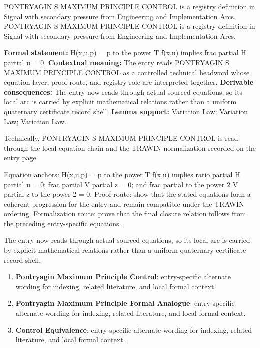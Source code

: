 
\begingroup\small
{}
PONTRYAGIN S MAXIMUM PRINCIPLE CONTROL is a registry definition in Signal with secondary pressure from Engineering and Implementation Arcs. PONTRYAGIN S MAXIMUM PRINCIPLE CONTROL is a registry definition in Signal with secondary pressure from Engineering and Implementation Arcs.

\begingroup\footnotesize\setlength{\emergencystretch}{3em}\sloppy
\textbf{Formal statement:} H(x,u,p) = p to the power T f(x,u) implies frac partial H partial u = 0. \textbf{Contextual meaning:} The entry reads PONTRYAGIN S MAXIMUM PRINCIPLE CONTROL as a controlled technical headword whose equation layer, proof route, and registry role are interpreted together. \textbf{Derivable consequences:} The entry now reads through actual sourced equations, so its local arc is carried by explicit mathematical relations rather than a uniform quaternary certificate record shell. \textbf{Lemma support:} Variation Law; Variation Law; Variation Law.\par
\endgroup

Technically, PONTRYAGIN S MAXIMUM PRINCIPLE CONTROL is read through the local equation chain and the TRAWIN normalization recorded on the entry page.

Equation anchors: H(x,u,p) = p to the power T f(x,u) implies ratio partial H partial u = 0; frac partial V partial z = 0; and frac partial to the power 2 V partial z to the power 2 = 0. Proof route: show that the stated equations form a coherent progression for the entry and remain compatible under the TRAWIN ordering. Formalization route: prove that the final closure relation follows from the preceding entry-specific equations.

The entry now reads through actual sourced equations, so its local arc is carried by explicit mathematical relations rather than a uniform quaternary certificate record shell.
\endgroup

\begin{enumerate}[leftmargin=1.6em,itemsep=6pt,topsep=4pt]
\item \textbf{Pontryagin Maximum Principle Control}: entry-specific alternate wording for indexing, related literature, and local formal context.
\item \textbf{Pontryagin Maximum Principle Formal Analogue}: entry-specific alternate wording for indexing, related literature, and local formal context.
\item \textbf{Control Equivalence}: entry-specific alternate wording for indexing, related literature, and local formal context.
\end{enumerate}

